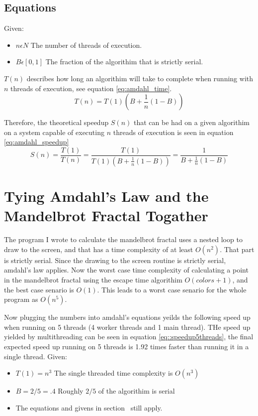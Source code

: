 \documentclass[10pt,oneside,letter]{article}
\begin{document}
\subsection{Equations}
Given:
\begin{itemize}
  \item $n \epsilon N$ The number of threads of execution.
  \item $B \epsilon [0,1]$ The fraction of the algorithim that is strictly serial.
\end{itemize}

$T(n)$ describes how long an algorithim will take to complete when running
with $n$ threads of execution, see equation \eqref{eq:amdahl_time}.
\begin{equation} \label{eq:amdahl_time}
    T(n) = T(1)(B + \frac{1}{n}(1-B))
\end{equation}

Therefore, the theoretical speedup $S(n)$ that can be had on a given algorithim
on a system capable of executing $n$ threads of execution is seen in equation
\eqref{eq:amdahl_speedup}
\begin{equation} \label{eq:amdahl_speedup}
    S(n) = \frac{T(1)}{T(n)}
         = \frac{T(1)}{T(1)(B+\frac{1}{n}(1-B))}
         = \frac{1}{B+\frac{1}{n}(1-B)}
\end{equation}

\section{Tying Amdahl's Law and the Mandelbrot Fractal Togather}
The program I wrote to calculate the mandelbrot fractal uses a nested loop to
draw to the screen, and that has a time complexity of at least $O(n^2)$. That
part is strictly serial. Since the drawing to the screen routine is strictly
serial, amdahl's law applies. Now the worst case time complexity of calculating a
point in the mandelbrot fractal using the escape time algorithim $O({colors} + 1)$,
and the best case senario is $O(1)$. This leads to a worst case senario for the
whole program as $O(n^5)$.

Now plugging the numbers into amdahl's equations yeilds the following speed up
when running on 5 threads (4 worker threads and 1 main thread). THe speed up
yielded by multithreading can be seen in equation \eqref{eq::speedup5threads},
the final expected speed up running on 5 threads is 1.92 times faster than running
it in a single thread.
Given:
\begin{itemize}
    \item $T(1) = n^3$ The single threaded time complexity is $O(n^3)$
    \item $B = 2/5 = .4$ Roughly $2/5$ of the algorithim is serial
    \item The equations and givens in section~\pageref{sec:Ahmdahl's Law} still apply.
\end{itemize}
\end{document}

